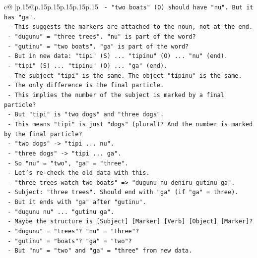 \documentclass{article}
\begin{document}
{\begin{supertabular}{c@{$\;$}|p{.15\linewidth}@{}p{.15\linewidth}p{.15\linewidth}p{.15\linewidth}p{.15\linewidth}p{.15\linewidth}}
{{{\texttt{         {-} "two boats" (O) should have "nu". But it has "ga".} \\
\texttt{       {-} This suggests the markers are attached to the noun, not at the end.} \\
\texttt{       {-} "dugunu" = "three trees". "nu" is part of the word?} \\
\texttt{       {-} "gutinu" = "two boats". "ga" is part of the word?} \\
\texttt{       {-} But in new data: "tipi" (S) ... "tipinu" (O) ... "nu" (end).} \\
\texttt{       {-} "tipi" (S) ... "tipinu" (O) ... "ga" (end).} \\
\texttt{       {-} The subject "tipi" is the same. The object "tipinu" is the same.} \\
\texttt{       {-} The only difference is the final particle.} \\
\texttt{       {-} This implies the number of the subject is marked by a final particle?} \\
\texttt{       {-} But "tipi" is "two dogs" and "three dogs".} \\
\texttt{       {-} This means "tipi" is just "dogs" (plural)? And the number is marked by the final particle?} \\
\texttt{       {-} "two dogs" {-}> "tipi ... nu".} \\
\texttt{       {-} "three dogs" {-}> "tipi ... ga".} \\
\texttt{       {-} So "nu" = "two", "ga" = "three".} \\
\texttt{       {-} Let's re{-}check the old data with this.} \\
\texttt{       {-} "three trees watch two boats" => "dugunu nu deniru gutinu ga".} \\
\texttt{         {-} Subject: "three trees". Should end with "ga" (if "ga" = three).} \\
\texttt{         {-} But it ends with "ga" after "gutinu".} \\
\texttt{         {-} "dugunu nu" ... "gutinu ga".} \\
\texttt{         {-} Maybe the structure is {[}Subject{]} {[}Marker{]} {[}Verb{]} {[}Object{]} {[}Marker{]}?} \\
\texttt{         {-} "dugunu" = "trees"? "nu" = "three"?} \\
\texttt{         {-} "gutinu" = "boats"? "ga" = "two"?} \\
\texttt{         {-} But "nu" = "two" and "ga" = "three" from new data.} \\
}}}
\end{supertabular}}
\end{document}
